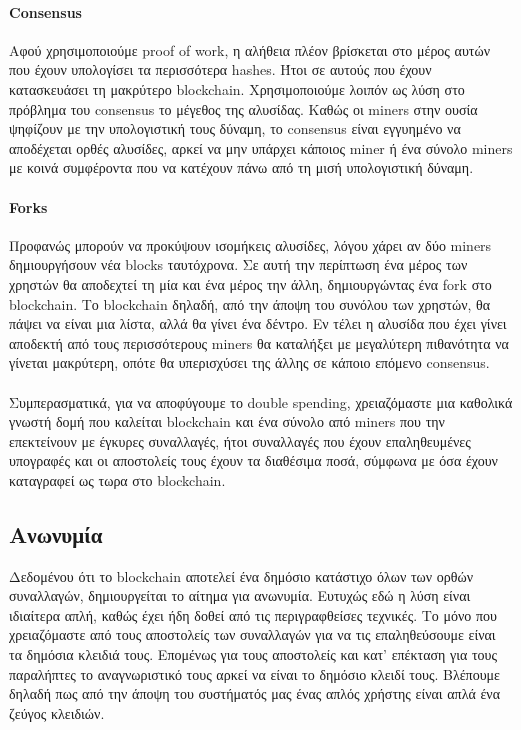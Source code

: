 \documentclass[titlepage]{article}
\begin{document}
\paragraph{Consensus}

Αφού χρησιμοποιούμε proof of work, η αλήθεια πλέον βρίσκεται στο μέρος αυτών που έχουν υπολογίσει τα περισσότερα hashes. Ήτοι σε αυτούς που έχουν κατασκευάσει τη μακρύτερο blockchain. Χρησιμοποιούμε λοιπόν ως λύση στο πρόβλημα του consensus το μέγεθος της αλυσίδας. Καθώς οι miners στην ουσία ψηφίζουν με την υπολογιστική τους δύναμη, το consensus είναι εγγυημένο να αποδέχεται ορθές αλυσίδες, αρκεί να μην υπάρχει κάποιος miner ή ένα σύνολο miners με κοινά συμφέροντα που να κατέχουν πάνω από τη μισή υπολογιστική δύναμη.

\paragraph{Forks}

Προφανώς μπορούν να προκύψουν ισομήκεις αλυσίδες, λόγου χάρει αν δύο miners δημιουργήσουν νέα blocks ταυτόχρονα. Σε αυτή την περίπτωση ένα μέρος των χρηστών θα αποδεχτεί τη μία και ένα μέρος την άλλη, δημιουργώντας ένα fork στο blockchain. Το blockchain δηλαδή, από την άποψη του συνόλου των χρηστών, θα πάψει να είναι μια λίστα, αλλά θα γίνει ένα δέντρο. Εν τέλει η αλυσίδα που έχει γίνει αποδεκτή από τους περισσότερους miners θα καταλήξει με μεγαλύτερη πιθανότητα να γίνεται μακρύτερη, οπότε θα υπερισχύσει της άλλης σε κάποιο επόμενο consensus.

\paragraph{}

Συμπερασματικά, για να αποφύγουμε το double spending, χρειαζόμαστε μια καθολικά γνωστή δομή που καλείται blockchain και ένα σύνολο από miners που την επεκτείνουν με έγκυρες συναλλαγές, ήτοι συναλλαγές που έχουν επαληθευμένες υπογραφές και οι αποστολείς τους έχουν τα διαθέσιμα ποσά, σύμφωνα με όσα έχουν καταγραφεί ως τωρα στο blockchain.

\subsection{Ανωνυμία}

Δεδομένου ότι το blockchain αποτελεί ένα δημόσιο κατάστιχο όλων των ορθών συναλλαγών, δημιουργείται το αίτημα για ανωνυμία. Ευτυχώς εδώ η λύση είναι ιδιαίτερα απλή, καθώς έχει ήδη δοθεί από τις περιγραφθείσες τεχνικές. Το μόνο που χρειαζόμαστε από τους αποστολείς των συναλλαγών για να τις επαληθεύσουμε είναι τα δημόσια κλειδιά τους. Επομένως για τους αποστολείς και κατ' επέκταση για τους παραλήπτες το αναγνωριστικό τους αρκεί να είναι το δημόσιο κλειδί τους. Βλέπουμε δηλαδή πως από την άποψη του συστήματός μας ένας απλός χρήστης είναι απλά ένα ζεύγος κλειδιών.
\end{document}
